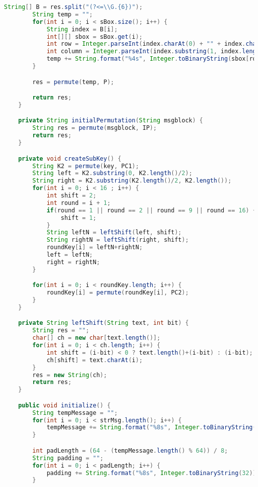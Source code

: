 \begin{lstlisting}[language=Java,basicstyle=\tiny,caption=DESEncryption.java]
        String[] B = res.split("(?<=\\G.{6})");
        String temp = "";
        for(int i = 0; i < sBox.size(); i++) {
            String index = B[i];
            int[][] sbox = sBox.get(i);
            int row = Integer.parseInt(index.charAt(0) + "" + index.charAt(index.length()-1) + "",2);
            int column = Integer.parseInt(index.substring(1, index.length()-1), 2);
            temp += String.format("%4s", Integer.toBinaryString(sbox[row][column])).replace(' ', '0');
        }

        res = permute(temp, P);

        return res;
    }

    private String initialPermutation(String msgblock) {
        String res = permute(msgblock, IP);
        return res;
    }

    private void createSubKey() {
        String K2 = permute(key, PC1);
        String left = K2.substring(0, K2.length()/2);
        String right = K2.substring(K2.length()/2, K2.length());
        for(int i = 0; i < 16 ; i++) {
            int shift = 2;
            int round = i + 1;
            if(round == 1 || round == 2 || round == 9 || round == 16) {
                shift = 1;
            }
            String leftN = leftShift(left, shift);
            String rightN = leftShift(right, shift);
            roundKey[i] = leftN+rightN;
            left = leftN;
            right = rightN;
        }

        for(int i = 0; i < roundKey.length; i++) {
            roundKey[i] = permute(roundKey[i], PC2);
        }
    }

    private String leftShift(String text, int bit) {
        String res = "";
        char[] ch = new char[text.length()];
        for(int i = 0; i < ch.length; i++) {
            int shift = (i-bit) < 0 ? text.length()+(i-bit) : (i-bit);
            ch[shift] = text.charAt(i);
        }
        res = new String(ch);
        return res;
    }

    public void initialize() {
        String tempMessage = "";
        for(int i = 0; i < strMsg.length(); i++) {
            tempMessage += String.format("%8s", Integer.toBinaryString(strMsg.charAt(i))).replace(' ', '0');
        }

        int padLength = (64 - (tempMessage.length() % 64)) / 8;
        String padding = "";
        for(int i = 0; i < padLength; i++) {
            padding += String.format("%8s", Integer.toBinaryString(32)).replace(' ', '0');
        }


\end{lstlisting}
